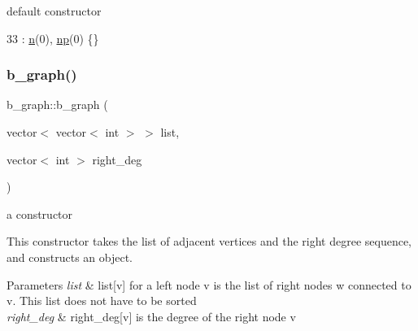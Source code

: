 default constructor 


\begin{DoxyCode}
33 : \hyperlink{classb__graph_a9e211d40c1799bc9b125de472ff06642}{n}(0), \hyperlink{classb__graph_acffdd5f20329515eb6ec17ad24f1ca64}{np}(0) \{\}
\end{DoxyCode}
\mbox{\label{classb__graph_a6032fbf9681d275260dd9a8587447e61}} 
\subsubsection{\texorpdfstring{b\+\_\+graph()}{b\_graph()}\hspace{0.1cm}{\footnotesize\ttfamily [2/3]}}
{\footnotesize\ttfamily b\+\_\+graph\+::b\+\_\+graph (\begin{DoxyParamCaption}\item[{vector$<$ vector$<$ int $>$ $>$}]{list,  }\item[{vector$<$ int $>$}]{right\+\_\+deg }\end{DoxyParamCaption})}



a constructor 

This constructor takes the list of adjacent vertices and the right degree sequence, and constructs an object. 
\begin{DoxyParams}{Parameters}
{\em list} & list\mbox{[}v\mbox{]} for a left node v is the list of right nodes w connected to v. This list does not have to be sorted \\
\hline
{\em right\+\_\+deg} & right\+\_\+deg\mbox{[}v\mbox{]} is the degree of the right node v \\
\hline
\end{DoxyParams}

